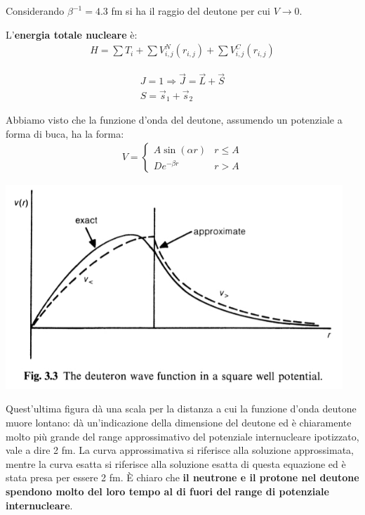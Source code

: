 \documentclass[a4paper,11pt,twoside,openany]{book}
\theoremstyle{definition}
\theoremstyle{plain}
\theoremstyle{plain}
\theoremstyle{definition}
\begin{document}
Considerando $\beta^{-1}=4.3$ fm si ha il raggio del deutone per cui $V\rightarrow 0$.

L'\textbf{energia totale nucleare} è:
\begin{equation}\begin{split}
H=\sum{T_i}+\sum{V_{i,j}^N\left(r_{i,j}\right)}+\sum{V_{i,j}^C\left(r_{i,j}\right)}
\end{split}\end{equation}

\begin{equation}\begin{split}
J=1 \Longrightarrow \vec J=\vec L+\vec S \\
S=\vec s_1+\vec s_2
\end{split}\end{equation}

Abbiamo visto che la funzione d'onda del deutone, assumendo un potenziale a forma di buca, ha la forma:
\begin{equation}\begin{split}
V=
\begin{cases}
A\sin\left(\alpha r\right) & r\le A \\
De^{-\beta r} & r>A 
\end{cases}
\end{split}\end{equation}

\begin{center}
\includegraphics[width=5in]{immagini/internucleon-potential.jpg} %
\end{center}

Quest'ultima figura dà una scala per la distanza a cui la funzione d'onda deutone muore lontano: dà un'indicazione della dimensione del deutone ed è chiaramente molto più grande del range approssimativo del potenziale internucleare ipotizzato, vale a dire 2 fm. La curva approssimativa si riferisce alla soluzione approssimata, mentre la curva esatta si riferisce alla soluzione esatta di questa equazione ed è stata presa per essere 2 fm. È chiaro che \textbf{il neutrone e il protone nel deutone spendono molto del loro tempo al di fuori del range di potenziale internucleare}.
\end{document}
